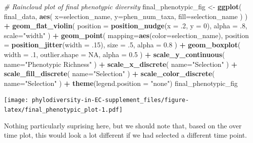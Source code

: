 \documentclass[]{book}
\newenvironment{Shaded}{\begin{snugshade}}{\end{snugshade}}
\newcommand{\CommentTok}[1]{\textcolor[rgb]{0.56,0.35,0.01}{\textit{#1}}}
\newcommand{\DataTypeTok}[1]{\textcolor[rgb]{0.13,0.29,0.53}{#1}}
\newcommand{\DecValTok}[1]{\textcolor[rgb]{0.00,0.00,0.81}{#1}}
\newcommand{\FloatTok}[1]{\textcolor[rgb]{0.00,0.00,0.81}{#1}}
\newcommand{\KeywordTok}[1]{\textcolor[rgb]{0.13,0.29,0.53}{\textbf{#1}}}
\newcommand{\NormalTok}[1]{#1}
\newcommand{\OperatorTok}[1]{\textcolor[rgb]{0.81,0.36,0.00}{\textbf{#1}}}
\newcommand{\OtherTok}[1]{\textcolor[rgb]{0.56,0.35,0.01}{#1}}
\newcommand{\StringTok}[1]{\textcolor[rgb]{0.31,0.60,0.02}{#1}}
\begin{document}
\begin{Shaded}
\begin{Highlighting}[]
\CommentTok{# Raincloud plot of final phenotypic diversity}
\NormalTok{final_phenotypic_fig <-}\StringTok{ }\KeywordTok{ggplot}\NormalTok{(}
\NormalTok{    final_data,}
    \KeywordTok{aes}\NormalTok{(}
      \DataTypeTok{x=}\NormalTok{selection_name,}
      \DataTypeTok{y=}\NormalTok{phen_num_taxa,}
      \DataTypeTok{fill=}\NormalTok{selection_name}
\NormalTok{    )}
\NormalTok{  ) }\OperatorTok{+}
\StringTok{  }\KeywordTok{geom_flat_violin}\NormalTok{(}
    \DataTypeTok{position =} \KeywordTok{position_nudge}\NormalTok{(}\DataTypeTok{x =} \FloatTok{.2}\NormalTok{, }\DataTypeTok{y =} \DecValTok{0}\NormalTok{),}
    \DataTypeTok{alpha =} \FloatTok{.8}\NormalTok{,}
    \DataTypeTok{scale=}\StringTok{"width"}
\NormalTok{  ) }\OperatorTok{+}
\StringTok{  }\KeywordTok{geom_point}\NormalTok{(}
    \DataTypeTok{mapping=}\KeywordTok{aes}\NormalTok{(}\DataTypeTok{color=}\NormalTok{selection_name),}
    \DataTypeTok{position =} \KeywordTok{position_jitter}\NormalTok{(}\DataTypeTok{width =} \FloatTok{.15}\NormalTok{),}
    \DataTypeTok{size =} \FloatTok{.5}\NormalTok{,}
    \DataTypeTok{alpha =} \FloatTok{0.8}
\NormalTok{  ) }\OperatorTok{+}
\StringTok{  }\KeywordTok{geom_boxplot}\NormalTok{(}
    \DataTypeTok{width =} \FloatTok{.1}\NormalTok{,}
    \DataTypeTok{outlier.shape =} \OtherTok{NA}\NormalTok{,}
    \DataTypeTok{alpha =} \FloatTok{0.5}
\NormalTok{  ) }\OperatorTok{+}
\StringTok{  }\KeywordTok{scale_y_continuous}\NormalTok{(}
    \DataTypeTok{name=}\StringTok{"Phenotypic Richness"}
\NormalTok{  ) }\OperatorTok{+}
\StringTok{  }\KeywordTok{scale_x_discrete}\NormalTok{(}
    \DataTypeTok{name=}\StringTok{"Selection"}
\NormalTok{  ) }\OperatorTok{+}
\StringTok{  }\KeywordTok{scale_fill_discrete}\NormalTok{(}
    \DataTypeTok{name=}\StringTok{"Selection"}
\NormalTok{  ) }\OperatorTok{+}
\StringTok{  }\KeywordTok{scale_color_discrete}\NormalTok{(}
    \DataTypeTok{name=}\StringTok{"Selection"}
\NormalTok{  ) }\OperatorTok{+}
\StringTok{  }\KeywordTok{theme}\NormalTok{(}\DataTypeTok{legend.position =} \StringTok{"none"}\NormalTok{)}
\NormalTok{final_phenotypic_fig}
\end{Highlighting}
\end{Shaded}

\texttt{[image: phylodiversity-in-EC-supplement\_files/figure-latex/final\_phenotypic\_plot-1.pdf]}

Nothing particularly suprising here, but we should note that, based on the over time plot, this would look a lot different if we had selected a different time point.
\end{document}
